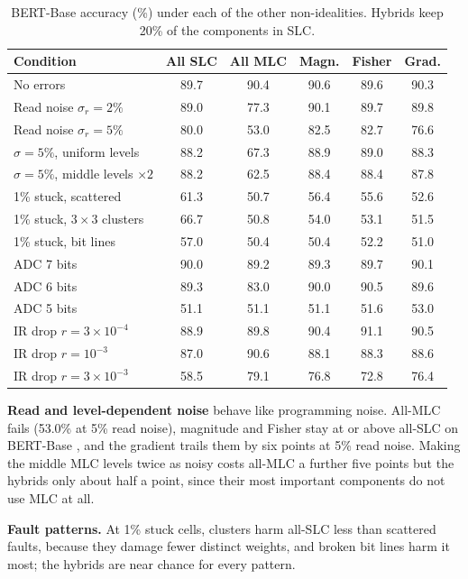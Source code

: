 \begin{table}[t]
\centering\footnotesize
\caption{BERT-Base accuracy (\%) under each of the other non-idealities. Hybrids keep 20\% of the components
in SLC.}\label{tab:chip}
\setlength{\tabcolsep}{2.4pt}
\begin{tabular}{@{}lccccc@{}}
\toprule
Condition & All SLC & All MLC & Magn. & Fisher & Grad. \\
\midrule
No errors & 89.7 & 90.4 & 90.6 & 89.6 & 90.3 \\
\midrule
Read noise $\sigma_r=2\%$ & 89.0 & 77.3 & 90.1 & 89.7 & 89.8 \\
Read noise $\sigma_r=5\%$ & 80.0 & 53.0 & 82.5 & 82.7 & 76.6 \\
$\sigma=5\%$, uniform levels & 88.2 & 67.3 & 88.9 & 89.0 & 88.3 \\
$\sigma=5\%$, middle levels $\times2$ & 88.2 & 62.5 & 88.4 & 88.4 & 87.8 \\
\midrule
1\% stuck, scattered & 61.3 & 50.7 & 56.4 & 55.6 & 52.6 \\
1\% stuck, $3\times3$ clusters & 66.7 & 50.8 & 54.0 & 53.1 & 51.5 \\
1\% stuck, bit lines & 57.0 & 50.4 & 50.4 & 52.2 & 51.0 \\
\midrule
ADC 7 bits & 90.0 & 89.2 & 89.3 & 89.7 & 90.1 \\
ADC 6 bits & 89.3 & 83.0 & 90.0 & 90.5 & 89.6 \\
ADC 5 bits & 51.1 & 51.1 & 51.1 & 51.6 & 53.0 \\
\midrule
IR drop $r=3\times10^{-4}$ & 88.9 & 89.8 & 90.4 & 91.1 & 90.5 \\
IR drop $r=10^{-3}$ & 87.0 & 90.6 & 88.1 & 88.3 & 88.6 \\
IR drop $r=3\times10^{-3}$ & 58.5 & 79.1 & 76.8 & 72.8 & 76.4 \\
\bottomrule
\end{tabular}
\end{table}

\textbf{Read and level-dependent noise} behave like programming noise. All-MLC fails (53.0\% at 5\% read
noise), magnitude and Fisher stay at or above all-SLC on BERT-Base , and the gradient trails them by six points at 5\% read noise.
Making the middle MLC levels twice as noisy costs all-MLC a further five points but the hybrids only about
half a point, since their most important components do not use MLC at all.

\textbf{Fault patterns.} At 1\% stuck cells, clusters harm all-SLC less than scattered faults, because
they damage fewer distinct weights, and broken bit lines harm it most; the hybrids are near chance for
every pattern.

